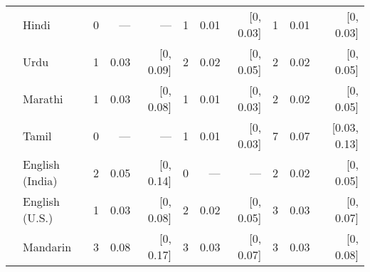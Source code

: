 \begin{table}[t]
\begin{footnotesize}
\begin{tabular}{p{.1in}lrrrrrrrrr}
 & Hindi & 0 & --- & --- & 1 & 0.01 & [0, 0.03] & 1 & 0.01 & [0, 0.03]\\

 & Urdu & 1 & 0.03 & [0, 0.09] & 2 & 0.02 & [0, 0.05] & 2 & 0.02 & [0, 0.05]\\

 & Marathi & 1 & 0.03 & [0, 0.08] & 1 & 0.01 & [0, 0.03] & 2 & 0.02 & [0, 0.05]\\

 & Tamil & 0 & --- & --- & 1 & 0.01 & [0, 0.03] & 7 & 0.07 & [0.03, 0.13]\\

 & English (India) & 2 & 0.05 & [0, 0.14] & 0 & --- & --- & 2 & 0.02 & [0, 0.05]\\

 & English (U.S.) & 1 & 0.03 & [0, 0.08] & 2 & 0.02 & [0, 0.05] & 3 & 0.03 & [0, 0.07]\\

& Mandarin & 3 & 0.08 & [0, 0.17] & 3 & 0.03 & [0, 0.07] & 3 & 0.03 & [0, 0.08]\\
\bottomrule
\end{tabular}
\end{footnotesize}
\end{table}
